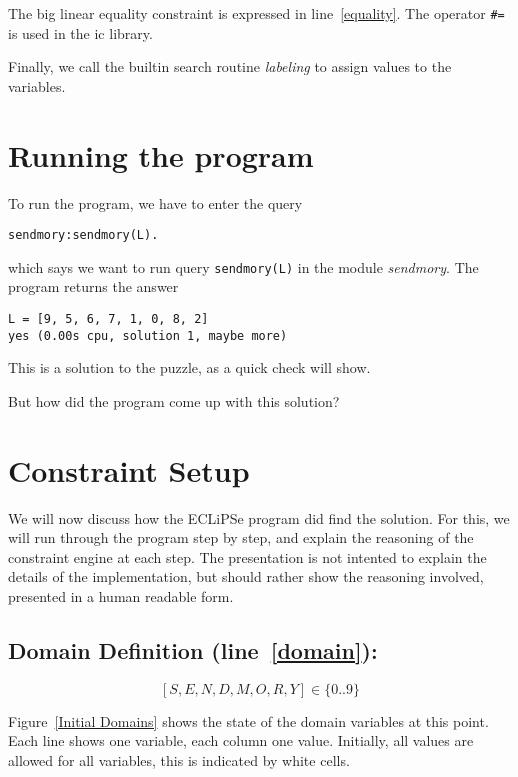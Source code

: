 \documentclass[a4paper]{article}
\begin{document}
The big linear equality constraint is expressed in line~\ref{equality}. The operator \verb$#=$ is used in the ic library.

Finally, we call the builtin search routine {\em labeling} to assign values to the variables.

\section{Running the program}
To run the program, we have to enter the query
\begin{verbatim}
sendmory:sendmory(L).
\end{verbatim}
which says we want to run query \verb$sendmory(L)$ in the module {\em sendmory}.
The program returns the answer
\begin{verbatim}
L = [9, 5, 6, 7, 1, 0, 8, 2]
yes (0.00s cpu, solution 1, maybe more)
\end{verbatim}
This is a solution to the puzzle, as a quick check will show.

But how did the program come up with this solution?

\section{Constraint Setup}

We will now discuss how the ECLiPSe program did find the solution. For this, we will run through the program step by step, and explain the reasoning of the constraint engine at each step. The presentation is not intented to explain the details of the implementation, but should rather show the reasoning involved, presented in a human readable form.

\subsection{Domain Definition (line~\ref{domain}):}
\[
[S,E,N,D,M,O,R,Y] \in \{0..9\}
\]

Figure~\ref{Initial Domains} shows the state of the domain variables at this point. Each line shows one variable, each column one value. Initially, all values are allowed for all variables, this is indicated by white cells.
 
\end{document}

